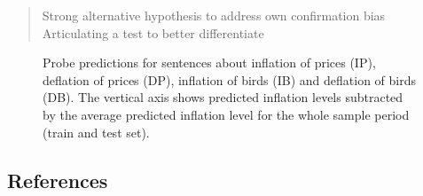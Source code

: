 \documentclass[
  letterpaper,
  DIV=11,
  numbers=noendperiod]{scrartcl}
\theoremstyle{plain}
\theoremstyle{remark}
\begin{document}
\begin{quote}
Strong alternative hypothesis to address own confirmation bias
Articulating a test to better differentiate
\end{quote}

\begin{figure}


\caption{\label{fig-attack}Probe predictions for sentences about
inflation of prices (IP), deflation of prices (DP), inflation of birds
(IB) and deflation of birds (DB). The vertical axis shows predicted
inflation levels subtracted by the average predicted inflation level for
the whole sample period (train and test set).}

\end{figure}%

\subsection*{References}\label{references}
\end{document}
